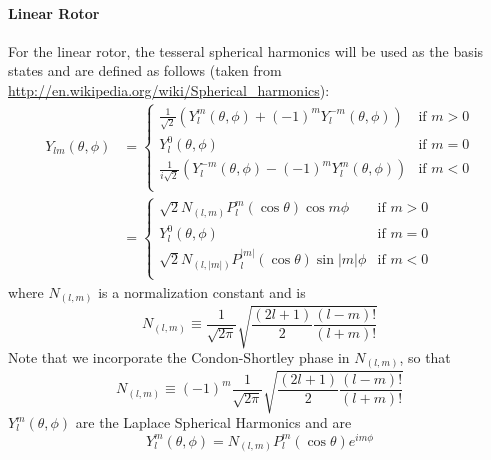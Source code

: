 \documentclass{revtex4-1}
\begin{document}
\paragraph{Linear Rotor}\label{S:LinRotBS}
For the linear rotor, the tesseral spherical harmonics will be used as the basis states and are defined as follows (taken from \url{http://en.wikipedia.org/wiki/Spherical_harmonics}):
\begin{align}
Y_{lm}(\theta,\phi)&=\begin{cases}\label{E:SphDefComb} 	\frac{1}{\sqrt{2}}\left(Y^{m}_{l}\left(\theta,\phi\right)+\left(-1\right)^{m}Y^{-m}_{l}\left(\theta,\phi\right)\right) &\mbox{if } m>0\\
								 	Y^{0}_{l}\left(\theta,\phi\right) &\mbox{if } m=0\\
								 	\frac{1}{i\sqrt{2}}\left(Y^{-m}_{l}\left(\theta,\phi\right)-\left(-1\right)^{m}Y^{m}_{l}\left(\theta,\phi\right)\right) &\mbox{if } m<0\\
								 	\end{cases}\\
				   &=\begin{cases}\label{E:SphDefTes} 	\sqrt{2}N_{\left(l,m\right)}P^{m}_{l}\left(\cos{\theta}\right)\cos{m\phi} &\mbox{if } m>0\\
				   					Y^{0}_{l}\left(\theta,\phi\right) &\mbox{if } m=0\\
									\sqrt{2}N_{\left(l,|m|\right)}P^{|m|}_{l}\left(\cos{\theta}\right)\sin{|m|\phi} &\mbox{if } m<0\\
				   					\end{cases}
\end{align}
where $N_{\left(l,m\right)}$ is a normalization constant and is 
\begin{equation}
N_{\left(l,m\right)}\equiv\frac{1}{\sqrt{2\pi}}\sqrt{\frac{\left(2l+1\right)}{2}\frac{\left(l-m\right)!}{\left(l+m\right)!}}
\end{equation}
Note that we incorporate the Condon-Shortley phase in $N_{\left(l,m\right)}$, so that 
\begin{equation}
N_{\left(l,m\right)}\equiv\left(-1\right)^{m}\frac{1}{\sqrt{2\pi}}\sqrt{\frac{\left(2l+1\right)}{2}\frac{\left(l-m\right)!}{\left(l+m\right)!}}
\end{equation}
$Y^{m}_{l}\left(\theta,\phi\right)$ are the Laplace Spherical Harmonics and are  
\begin{equation}
Y^{m}_{l}\left(\theta,\phi\right)=N_{\left(l,m\right)}P^{m}_{l}\left(\cos{\theta}\right)e^{im\phi}
\end{equation}
\end{document}

